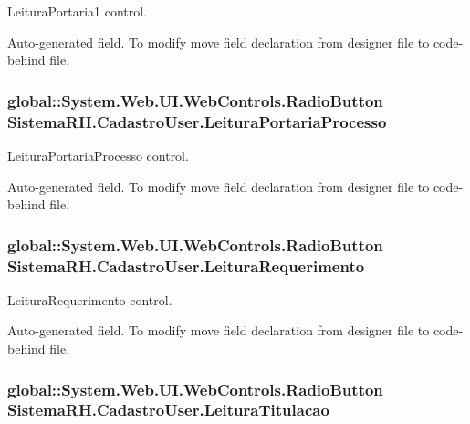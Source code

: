 LeituraPortaria1 control. 

Auto-\/generated field. To modify move field declaration from designer file to code-\/behind file. \hypertarget{class_sistema_r_h_1_1_cadastro_user_abaf30d02ff01cd234cd2c48a2465c48c}{
\subsubsection[{LeituraPortariaProcesso}]{\setlength{\rightskip}{0pt plus 5cm}global::System.Web.UI.WebControls.RadioButton {\bf SistemaRH.CadastroUser.LeituraPortariaProcesso}}}
\label{class_sistema_r_h_1_1_cadastro_user_abaf30d02ff01cd234cd2c48a2465c48c}


LeituraPortariaProcesso control. 

Auto-\/generated field. To modify move field declaration from designer file to code-\/behind file. \hypertarget{class_sistema_r_h_1_1_cadastro_user_a7e33448bca7dd95cae0bef4afd3f0d27}{
\subsubsection[{LeituraRequerimento}]{\setlength{\rightskip}{0pt plus 5cm}global::System.Web.UI.WebControls.RadioButton {\bf SistemaRH.CadastroUser.LeituraRequerimento}}}
\label{class_sistema_r_h_1_1_cadastro_user_a7e33448bca7dd95cae0bef4afd3f0d27}


LeituraRequerimento control. 

Auto-\/generated field. To modify move field declaration from designer file to code-\/behind file. \hypertarget{class_sistema_r_h_1_1_cadastro_user_ae4fb6be405068ea2ae744a63799a4a83}{
\subsubsection[{LeituraTitulacao}]{\setlength{\rightskip}{0pt plus 5cm}global::System.Web.UI.WebControls.RadioButton {\bf SistemaRH.CadastroUser.LeituraTitulacao}}}
\label{class_sistema_r_h_1_1_cadastro_user_ae4fb6be405068ea2ae744a63799a4a83}


